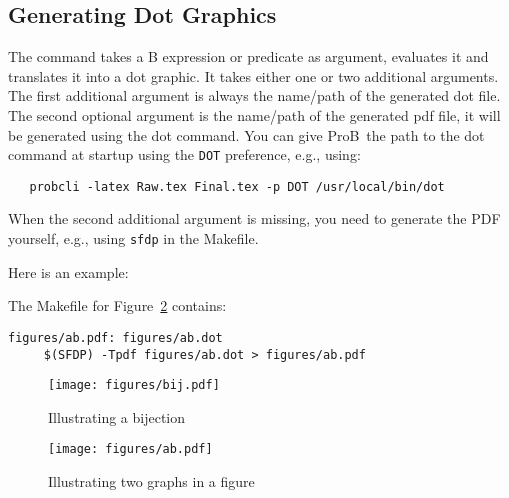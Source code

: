 \documentclass[final]{llncs}
\newcommand{\prob}{{\sc ProB}}
\newcommand{\probdot}[3][File]{dot} %
\begin{document}
\subsection{Generating Dot Graphics}
The {\tt {}} command takes a B expression or predicate as argument, evaluates it and 
 translates it into a dot graphic.
It takes either one or two additional arguments.
The first additional argument is always the name/path of the generated dot file.
The second optional argument is the name/path of the generated pdf file, it will be generated
using the dot command.
You can give \prob\ the path to the dot command at startup using the {\tt DOT} preference, e.g., using:
\begin{verbatim}
   probcli -latex Raw.tex Final.tex -p DOT /usr/local/bin/dot
\end{verbatim}

When the second additional argument is missing, you need to generate the PDF yourself, e.g., using {\tt sfdp}
  in the Makefile.

Here is an example:

The Makefile for Figure~\ref{fig:ab} contains:
\begin{verbatim}
figures/ab.pdf: figures/ab.dot
     $(SFDP) -Tpdf figures/ab.dot > figures/ab.pdf
\end{verbatim}

\begin{figure}
  \centering
  \texttt{[image: figures/bij.pdf]}
  \caption{Illustrating a bijection}
  \label{fig:bij}
\end{figure}

\begin{figure}
  \centering
  \texttt{[image: figures/ab.pdf]}
  \caption{Illustrating two graphs in a figure}
  \label{fig:ab}
\end{figure}
\end{document}

